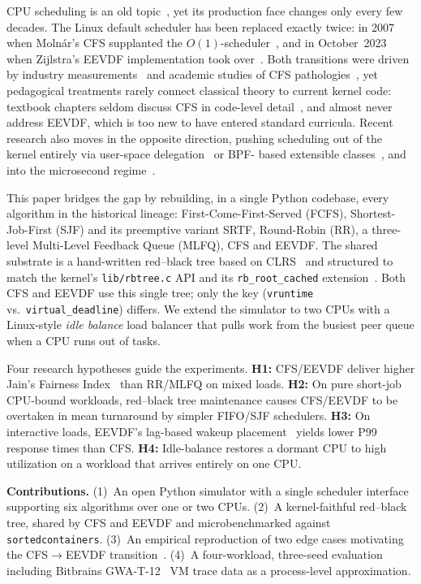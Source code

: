 \documentclass[conference]{IEEEtran}
\begin{document}
CPU scheduling is an old topic~\cite{silberschatz2018,tanenbaum2014},
yet its production face changes only every few decades. The Linux
default scheduler has been replaced exactly twice: in 2007 when
Moln\'ar's CFS supplanted the
$O(1)$-scheduler~\cite{molnar_cfs_2007,corbet_cfs_2007}, and in
October~2023 when Zijlstra's EEVDF implementation took
over~\cite{zijlstra_eevdf_default_2023,corbet_eevdf_2023}. Both
transitions were driven by industry measurements~\cite{zijlstra_lkml_2023}
and academic studies of CFS pathologies~\cite{lozi2016}, yet
pedagogical treatments rarely connect classical theory to current
kernel code: textbook chapters seldom discuss CFS in code-level
detail~\cite{tanenbaum2014}, and almost never address EEVDF, which is
too new to have entered standard curricula. Recent research also moves
in the opposite direction, pushing scheduling out of the kernel
entirely via user-space delegation~\cite{humphries2021ghost} or BPF-
based extensible classes~\cite{linux_schedext_doc_2024,
corbet_schedext_2024,corbet_schedext_lpc_2024}, and into the
microsecond regime~\cite{fried2020caladan}.

This paper bridges the gap by rebuilding, in a single Python codebase,
every algorithm in the historical lineage: First-Come-First-Served
(FCFS), Shortest-Job-First (SJF) and its preemptive variant SRTF,
Round-Robin (RR), a three-level Multi-Level Feedback Queue (MLFQ), CFS
and EEVDF. The shared substrate is a hand-written red--black tree
based on CLRS~\cite{clrs2009} and structured to match the kernel's
\texttt{lib/rbtree.c} API and its \texttt{rb\_root\_cached}
extension~\cite{rb_cached_2017}. Both CFS and EEVDF use this single
tree; only the key (\texttt{vruntime} vs.\
\texttt{virtual\_deadline}) differs. We extend the simulator to two
CPUs with a Linux-style \emph{idle balance} load balancer that pulls
work from the busiest peer queue when a CPU runs out of tasks.

Four research hypotheses guide the experiments. \textbf{H1:} CFS/EEVDF
deliver higher Jain's Fairness Index~\cite{jain1984} than RR/MLFQ on
mixed loads. \textbf{H2:} On pure short-job CPU-bound workloads,
red--black tree maintenance causes CFS/EEVDF to be overtaken in mean
turnaround by simpler FIFO/SJF schedulers. \textbf{H3:} On interactive
loads, EEVDF's lag-based wakeup
placement~\cite{zijlstra_eevdf_lag_2023} yields lower P99 response
times than CFS. \textbf{H4:} Idle-balance restores a dormant CPU to
high utilization on a workload that arrives entirely on one CPU.

\noindent\textbf{Contributions.} (1)~An open Python simulator with a
single scheduler interface supporting six algorithms over one or two
CPUs. (2)~A kernel-faithful red--black tree, shared by CFS and EEVDF
and microbenchmarked against \texttt{sortedcontainers}. (3)~An
empirical reproduction of two edge cases motivating the CFS$\to$EEVDF
transition~\cite{zijlstra_lkml_2023}. (4)~A four-workload, three-seed
evaluation including Bitbrains GWA-T-12~\cite{shen2015bitbrains} VM
trace data as a process-level approximation.
\end{document}
